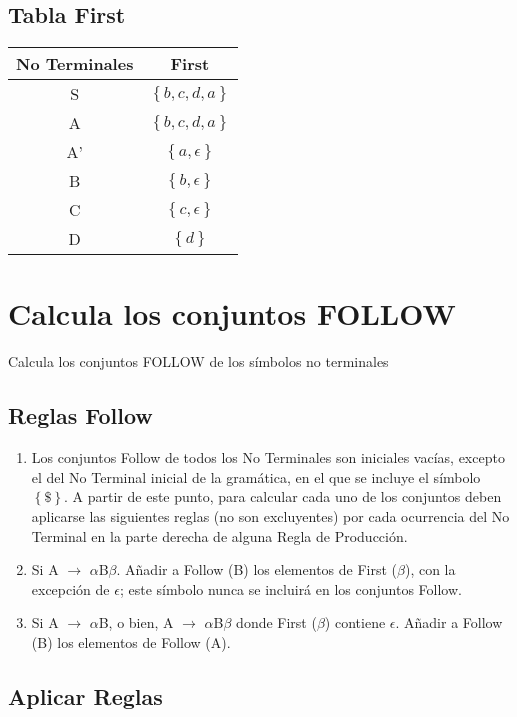 \documentclass[10pt]{article}
\begin{document}
\subsection{Tabla First}
\begin{center}
\begin{tabular}{|c| c| } 
 \hline
 No Terminales & First \\ [0.5ex] 
 \hline
 S & $\left \{b, c, d, a  \right \}$ \\ 
 \hline
 A & $\left \{b, c, d, a  \right \}$  \\
 \hline
 A' & $\left \{a, \epsilon  \right \}$  \\
 \hline
 B & $\left \{b, \epsilon  \right \}$\\
 \hline
 C & $\left \{c, \epsilon  \right \}$ \\ 
 \hline
 D & $\left \{d  \right \}$ \\ 
 \hline
\end{tabular}
\end{center}

\section{Calcula los conjuntos FOLLOW }
Calcula los conjuntos FOLLOW de los símbolos no terminales
\subsection{Reglas Follow}
\begin{enumerate}
    \item Los conjuntos Follow de todos los No Terminales son iniciales vacías, excepto el del No Terminal inicial de la gramática, en el que se incluye el símbolo $\left \{\$  \right \}$. A partir de este punto, para calcular cada uno de los conjuntos deben aplicarse las siguientes reglas (no son excluyentes) por cada ocurrencia del No Terminal en la parte derecha de alguna Regla de Producción.
    \item Si A $\rightarrow$ $\alpha$B$\beta$. Añadir a Follow (B) los elementos de First ($\beta$), con la excepción de $\epsilon$; este símbolo nunca se incluirá en los conjuntos Follow.
    \item Si A $\rightarrow$ $\alpha$B, o bien, A $\rightarrow$ $\alpha$B$\beta$ donde First ($\beta$) contiene $\epsilon$. Añadir a Follow (B) los elementos de Follow (A).
\end{enumerate}
\subsection{Aplicar Reglas}
\end{document}
